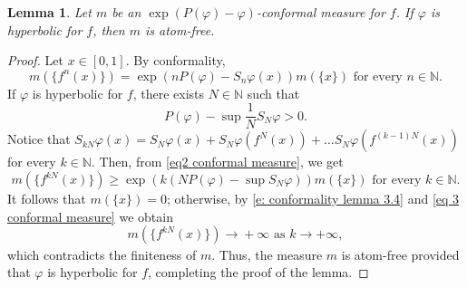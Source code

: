 \documentclass[10pt,a4paper]{amsart}
\numberwithin{equation}{section} %
\numberwithin{figure}{section} %
\newtheorem{lemm}[prop]{Lemma}
\newcommand{\N}{\mathbb{N}}
\renewcommand{\=}{\coloneqq}
\begin{document}
\begin{lemm}\label{lemma atoms of conformal measure}
    Let $m$ be an $\exp(P(\varphi)-\varphi)$-conformal measure for $f$. If $\varphi$ is hyperbolic for $f$, then $m$ is atom-free.
\end{lemm}
\begin{proof} Let $x\in [0,1]$. By conformality,
      \begin{equation}\label{eq2 conformal measure}
          m(\{f^{n}(x)\})= \exp(nP(\varphi) - S_{n} \varphi(x))m(\{x\}) \text{ for every }n\in\N.
      \end{equation}
   If $\varphi$ is hyperbolic for $f$, there exists $N\in \N$ such that
   \begin{equation}\label{e: conformality lemma 3.4}
       P(\varphi) - \sup \frac{1}{N} S_N \varphi >0.
   \end{equation}
      Notice that $S_{kN}\varphi(x) = S_N\varphi(x) + S_N\varphi(f^N(x))+\dots S_N \varphi(f^{(k-1)N}(x))$ for every $k\in\N$. Then, from \eqref{eq2 conformal measure}, we get
      \begin{equation}\label{eq 3 conformal measure}
          m(\{f^{kN}(x)\}) \geq \exp(k(NP(\varphi) - \sup S_N \varphi))m(\{x\}) \text{ for every }k\in\N.
      \end{equation}
    It follows that $m(\{x\})=0$; otherwise, by \eqref{e: conformality lemma 3.4} and \eqref{eq 3 conformal measure} we obtain \begin{equation*}
        m(\{f^{kN}(x)\})\xrightarrow[]{} +\infty \text{ as }k\to +\infty,
    \end{equation*}
      which contradicts the finiteness of $m$. Thus, the measure $m$ is atom-free provided that $\varphi$ is hyperbolic for $f$, completing the proof of the lemma.
\end{proof}
\end{document}
